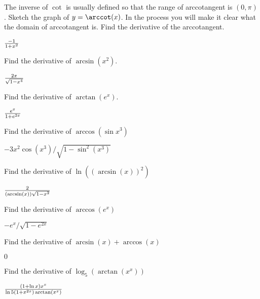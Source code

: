 \begin{exercises}

\begin{exercise} The inverse of $\cot$ is usually defined so that the
 range of arccotangent is $(0, \pi)$.  Sketch the graph of
 $y=\arccot(x)$. In the process you will make it clear what the domain
 of arccotangent is. Find the derivative of the arccotangent.
\begin{answer} ${-1\over 1+x^2}$
\end{answer}\end{exercise}


\begin{exercise} Find the derivative of $\arcsin(x^2)$.
\begin{answer} ${2x\over\sqrt{1-x^4}}$
\end{answer}\end{exercise}

\begin{exercise} Find the derivative of $\arctan(e^x)$.
\begin{answer} ${e^x\over1+e^{2x}}$
\end{answer}\end{exercise}

\begin{exercise} Find the derivative of $\arccos (\sin x^3 )$
\begin{answer} $-3x^2\cos(x^3)/\sqrt{1-\sin^2(x^3)}$
\end{answer}\end{exercise}

\begin{exercise} Find the derivative of $\ln( (\arcsin(x) )^2)$
\begin{answer} ${2\over(\arcsin(x))\sqrt{1-x^2}}$
\end{answer}\end{exercise}

\begin{exercise} Find the derivative of $\arccos(e^x)$
\begin{answer} $-e^x/\sqrt{1-e^{2x}}$
\end{answer}\end{exercise}

\begin{exercise} Find the derivative of $\arcsin(x) + \arccos(x)$
\begin{answer} $0$
\end{answer}\end{exercise}

\begin{exercise} Find the derivative of $\log _5 (\arctan (x^x ) )$
\begin{answer} ${(1+\ln x)x^x\over\ln5(1+x^{2x})\arctan(x^x)}$
\end{answer}\end{exercise}

\end{exercises}
